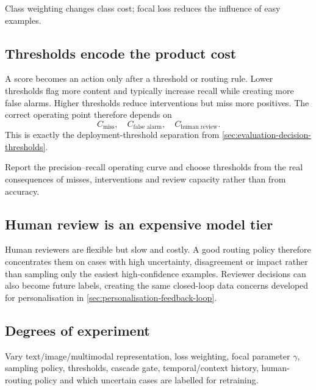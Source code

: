 \begin{calloutmemoryhook}
Class weighting changes class cost; focal loss reduces the influence of easy examples.
\end{calloutmemoryhook}

\subsection{Thresholds encode the product cost}
\label{sec:moderation-thresholds}
A score becomes an action only after a threshold or routing rule.
Lower thresholds flag more content and typically increase recall while creating more false alarms.
Higher thresholds reduce interventions but miss more positives.
The correct operating point therefore depends on
\[
\boxed{
C_{\text{miss}}
,\quad
C_{\text{false alarm}}
,\quad
C_{\text{human review}}
}.
\]
This is exactly the deployment-threshold separation from \cref{sec:evaluation-decision-thresholds}.

\begin{calloutpractical}
Report the precision--recall operating curve and choose thresholds from the real consequences of misses, interventions and review capacity rather than from accuracy.
\end{calloutpractical}

\subsection{Human review is an expensive model tier}
\label{sec:moderation-human}
Human reviewers are flexible but slow and costly.
A good routing policy therefore concentrates them on cases with high uncertainty, disagreement or impact rather than sampling only the easiest high-confidence examples.
Reviewer decisions can also become future labels, creating the same closed-loop data concerns developed for personalisation in \cref{sec:personalisation-feedback-loop}.

\subsection{Degrees of experiment}
\label{sec:moderation-optionality}
\begin{calloutdegreeofexperiment}
Vary text/image/multimodal representation, loss weighting, focal parameter $\gamma$, sampling policy, thresholds, cascade gate, temporal/context history, human-routing policy and which uncertain cases are labelled for retraining.
\end{calloutdegreeofexperiment}

